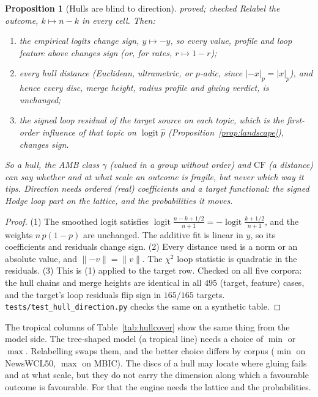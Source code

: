 \documentclass[11pt]{article}
\newtheorem{proposition}[theorem]{Proposition}
\theoremstyle{definition}
\theoremstyle{remark}
\newcommand{\CF}{\mathrm{CF}}
\newcommand{\st}[1]{\textsf{\small\color{gray}#1}}
\begin{document}
\begin{proposition}[Hulls are blind to direction]\label{prop:hulldirection}\st{proved; checked}
Relabel the outcome, $k\mapsto n-k$ in every cell. Then:
\begin{enumerate}
  \item the empirical logits change sign, $y\mapsto-y$, so every value, profile and loop feature above changes sign (or, for rates, $r\mapsto1-r$);
  \item every hull distance (Euclidean, ultrametric, or $p$-adic, since $|{-x}|_p=|x|_p$), and hence every disc, merge height, radius profile and gluing verdict, is unchanged;
  \item the signed loop residual of the target source on each topic, which is the first-order influence of that topic on $\operatorname{logit}\hat p$ (Proposition~\ref{prop:landscape}), changes sign.
\end{enumerate}
So a hull, the AMB class $\gamma$ (valued in a group without order) and $\CF$ (a distance) can say \emph{whether} and \emph{at what scale} an outcome is fragile, but never \emph{which way} it tips. Direction needs ordered (real) coefficients and a target functional: the signed Hodge loop part on the lattice, and the probabilities it moves.
\end{proposition}
\begin{proof}
(1) The smoothed logit satisfies $\operatorname{logit}\frac{n-k+1/2}{n+1}=-\operatorname{logit}\frac{k+1/2}{n+1}$, and the weights $n\,p(1-p)$ are unchanged. The additive fit is linear in $y$, so its coefficients and residuals change sign. (2) Every distance used is a norm or an absolute value, and $\|{-v}\|=\|v\|$. The $\chi^2$ loop statistic is quadratic in the residuals. (3) This is (1) applied to the target row. Checked on all five corpora: the hull chains and merge heights are identical in all $495$ (target, feature) cases, and the target's loop residuals flip sign in $165/165$ targets. \texttt{tests/test\_hull\_direction.py} checks the same on a synthetic table.
\end{proof}
\noindent The tropical columns of Table~\ref{tab:hullcover} show the same thing from the model side. The tree-shaped model (a tropical line) needs a choice of $\min$ or $\max$. Relabelling swaps them, and the better choice differs by corpus ($\min$ on NewsWCL50, $\max$ on MBIC). The discs of a hull may locate where gluing fails and at what scale, but they do not carry the dimension along which a favourable outcome is favourable. For that the engine needs the lattice and the probabilities.
\end{document}
